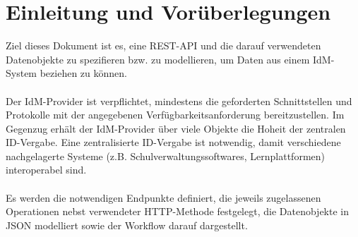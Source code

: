 \chapter{Einleitung und Vorüberlegungen}
Ziel dieses Dokument ist es, eine REST-API und die darauf verwendeten Datenobjekte zu spezifieren bzw. zu modellieren, um Daten aus einem IdM-System beziehen zu können.\\
\\
Der IdM-Provider ist verpflichtet, mindestens die geforderten Schnittstellen und Protokolle mit der angegebenen Verfügbarkeitsanforderung bereitzustellen. 
Im Gegenzug erhält der IdM-Provider über viele Objekte die Hoheit der zentralen ID-Vergabe. 
Eine zentralisierte ID-Vergabe ist notwendig, damit verschiedene nachgelagerte Systeme (z.B. Schulverwaltungssoftwares, Lernplattformen) interoperabel sind.\\
\\
Es werden die notwendigen Endpunkte definiert, die jeweils zugelassenen Operationen nebst verwendeter HTTP-Methode festgelegt, die Datenobjekte in JSON modelliert sowie der Workflow darauf dargestellt.

